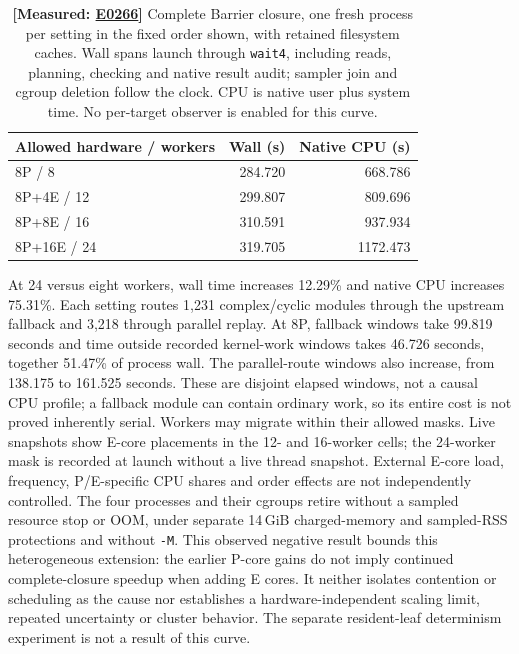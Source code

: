 \documentclass[10pt,twocolumn]{article}
\newcommand{\measured}[1]{\textbf{[Measured: #1]}}
\newcommand{\expref}[2]{\href{https://github.com/yunwei37/proofserve/blob/main/docs/tmp/build-and-evaluate/step-#1/step-report.md}{E#2}}
\begin{document}
\begin{table}[t]
\centering\small
\begin{tabular}{lrr}
\toprule
Allowed hardware / workers & Wall (s) & Native CPU (s)\\
\midrule
8P / 8 &284.720&668.786\\
8P+4E / 12 &299.807&809.696\\
8P+8E / 16 &310.591&937.934\\
8P+16E / 24 &319.705&1172.473\\
\bottomrule
\end{tabular}
\caption{\measured{\expref{0266-20261102T083616+0000}{0266}} Complete Barrier closure, one fresh process per setting in the
fixed order shown, with retained filesystem caches.
Wall spans launch through \texttt{wait4}, including reads, planning,
checking and native result audit; sampler join and cgroup deletion follow
the clock. CPU is native user plus system time. No per-target observer
is enabled for this curve.}
\label{tab:heterogeneous}
\end{table}

At 24 versus eight workers, wall time increases 12.29\% and native CPU
increases 75.31\%.
Each setting routes 1,231 complex/cyclic modules through the upstream
fallback and 3,218 through parallel replay.
At 8P, fallback windows take 99.819 seconds and time outside recorded
kernel-work windows takes 46.726 seconds, together 51.47\% of process wall.
The parallel-route windows also increase, from 138.175 to 161.525 seconds.
These are disjoint elapsed windows, not a causal CPU profile; a fallback
module can contain ordinary work, so its entire cost is not proved
inherently serial.
Workers may migrate within their allowed masks. Live snapshots show
E-core placements in the 12- and 16-worker cells; the 24-worker mask is
recorded at launch without a live thread snapshot.
External E-core load, frequency, P/E-specific CPU shares and order effects
are not independently controlled.
The four processes and their cgroups retire without a sampled resource stop
or OOM, under separate 14\,GiB charged-memory and sampled-RSS protections
and without \texttt{-M}.
This observed negative result bounds this heterogeneous extension:
the earlier P-core gains do not imply continued complete-closure speedup
when adding E cores.
It neither isolates contention or scheduling as the cause nor establishes
a hardware-independent scaling limit, repeated uncertainty or cluster behavior.
The separate resident-leaf determinism experiment is not a result of this curve.
\end{document}
